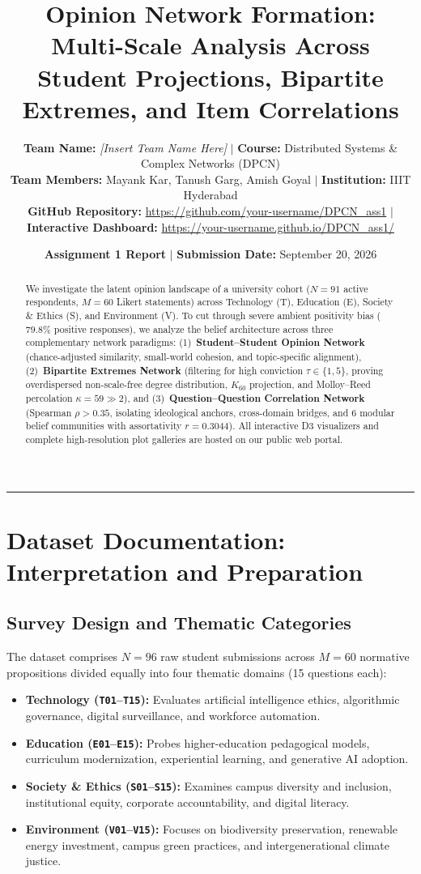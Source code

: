 \documentclass[10pt, a4paper]{article}
\title{\vspace{-1.8em}\textbf{Opinion Network Formation: Multi-Scale Analysis Across Student Projections, Bipartite Extremes, and Item Correlations}\vspace{-0.5em}}
\author{
    \textbf{Team Name:} \textit{[Insert Team Name Here]} \quad $\vert$ \quad \textbf{Course:} Distributed Systems \& Complex Networks (DPCN) \\
    \textbf{Team Members:} Mayank Kar, Tanush Garg, Amish Goyal \quad $\vert$ \quad \textbf{Institution:} IIIT Hyderabad \\
    \textbf{GitHub Repository:} \url{https://github.com/your-username/DPCN_ass1} \quad $\vert$ \quad
    \textbf{Interactive Dashboard:} \url{https://your-username.github.io/DPCN_ass1/}
}
\date{\vspace{-0.6em}\textbf{Assignment 1 Report} \quad $\vert$ \quad \textbf{Submission Date:} September 20, 2026\vspace{-0.9em}}
\begin{document}
\maketitle

\begin{abstract}
\small
We investigate the latent opinion landscape of a university cohort ($N=91$ active respondents, $M=60$ Likert statements) across Technology (T), Education (E), Society \& Ethics (S), and Environment (V). To cut through severe ambient positivity bias ($79.8\%$ positive responses), we analyze the belief architecture across three complementary network paradigms: (1)~\textbf{Student--Student Opinion Network} (chance-adjusted similarity, small-world cohesion, and topic-specific alignment), (2)~\textbf{Bipartite Extremes Network} (filtering for high conviction $\tau \in \{1, 5\}$, proving overdispersed non-scale-free degree distribution, $K_{60}$ projection, and Molloy--Reed percolation $\kappa = 59 \gg 2$), and (3)~\textbf{Question--Question Correlation Network} (Spearman $\rho > 0.35$, isolating ideological anchors, cross-domain bridges, and 6 modular belief communities with assortativity $r = 0.3044$). All interactive D3 visualizers and complete high-resolution plot galleries are hosted on our public web portal.
\end{abstract}

\vspace{-0.6em}
\hrule
\vspace{0.6em}

\section{Dataset Documentation: Interpretation and Preparation}

\subsection{Survey Design and Thematic Categories}
The dataset comprises $N = 96$ raw student submissions across $M = 60$ normative propositions divided equally into four thematic domains (15 questions each):
\begin{itemize}
    \setlength{\itemsep}{0pt}
    \item \textbf{Technology (\texttt{T01}--\texttt{T15}):} Evaluates artificial intelligence ethics, algorithmic governance, digital surveillance, and workforce automation.
    \item \textbf{Education (\texttt{E01}--\texttt{E15}):} Probes higher-education pedagogical models, curriculum modernization, experiential learning, and generative AI adoption.
    \item \textbf{Society \& Ethics (\texttt{S01}--\texttt{S15}):} Examines campus diversity and inclusion, institutional equity, corporate accountability, and digital literacy.
    \item \textbf{Environment (\texttt{V01}--\texttt{V15}):} Focuses on biodiversity preservation, renewable energy investment, campus green practices, and intergenerational climate justice.
\end{itemize}
\end{document}
